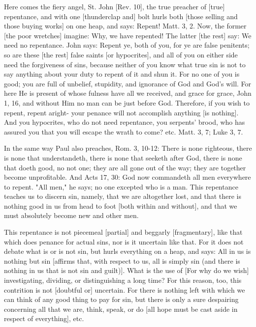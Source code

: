 Here comes the fiery angel, St. John [Rev. 10], the true
preacher of [true] repentance, and with one [thunderclap and]
bolt hurls both [those selling and those buying works] on one
heap, and says: Repent! Matt. 3, 2. Now, the former [the poor
wretches] imagine: Why, we have repented! The latter [the
rest] say: We need no repentance. John says: Repent ye, both
of you, for ye are false penitents; so are these [the rest]
false saints [or hypocrites], and all of you on either side
need the forgiveness of sins, because neither of you know what
true sin is not to say anything about your duty to repent of
it and shun it. For no one of you is good; you are full of
unbelief, stupidity, and ignorance of God and God's will. For
here He is present of whose fulness have all we received, and
grace for grace, John 1, 16, and without Him no man can be
just before God. Therefore, if you wish to repent, repent
aright- your penance will not accomplish anything [is
nothing]. And you hypocrites, who do not need repentance, you
serpents' brood, who has assured you that you will escape the
wrath to come? etc. Matt. 3, 7; Luke 3, 7.

In the same way Paul also preaches, Rom. 3, 10-12: There is
none righteous, there is none that understandeth, there is
none that seeketh after God, there is none that doeth good, no
not one; they are all gone out of the way; they are together
become unprofitable. And Acts 17, 30: God now commandeth all
men everywhere to repent. "All men," he says; no one excepted
who is a man. This repentance teaches us to discern sin,
namely, that we are altogether lost, and that there is nothing
good in us from head to foot [both within and without], and
that we must absolutely become new and other men.

This repentance is not piecemeal [partial] and beggarly
[fragmentary], like that which does penance for actual sins,
nor is it uncertain like that. For it does not debate what is
or is not sin, but hurls everything on a heap, and says: All
in us is nothing but sin [affirms that, with respect to us,
all is simply sin (and there is nothing in us that is not sin
and guilt)]. What is the use of [For why do we wish]
investigating, dividing, or distinguishing a long time? For
this reason, too, this contrition is not [doubtful or]
uncertain. For there is nothing left with which we can think
of any good thing to pay for sin, but there is only a sure
despairing concerning all that we are, think, speak, or do
[all hope must be cast aside in respect of everything], etc.

